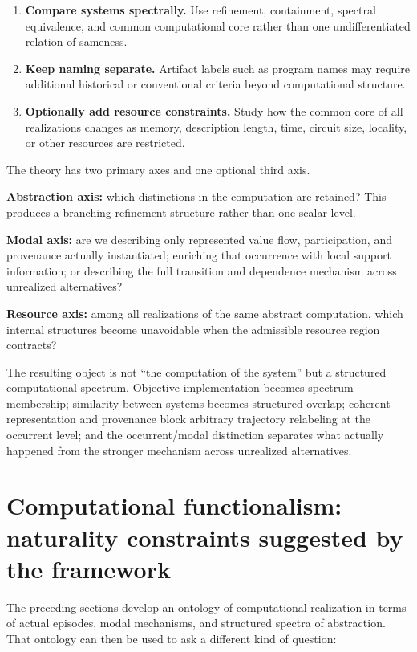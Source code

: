 \documentclass[11pt,a4paper]{article}
\begin{document}
\begin{enumerate}
  \item \textbf{Compare systems spectrally.} Use refinement, containment, spectral equivalence, and common computational core rather than one undifferentiated relation of sameness.
  \item \textbf{Keep naming separate.} Artifact labels such as program names may require additional historical or conventional criteria beyond computational structure.
  \item \textbf{Optionally add resource constraints.} Study how the common core of all realizations changes as memory, description length, time, circuit size, locality, or other resources are restricted.
\end{enumerate}

\begin{thesisbox}[title={The final picture}]
The theory has two primary axes and one optional third axis.

\textbf{Abstraction axis:} which distinctions in the computation are retained? This produces a branching refinement structure rather than one scalar level.

\textbf{Modal axis:} are we describing only represented value flow, participation, and provenance actually instantiated; enriching that occurrence with local support information; or describing the full transition and dependence mechanism across unrealized alternatives?

\textbf{Resource axis:} among all realizations of the same abstract computation, which internal structures become unavoidable when the admissible resource region contracts?

The resulting object is not ``the computation of the system'' but a structured computational spectrum. Objective implementation becomes spectrum membership; similarity between systems becomes structured overlap; coherent representation and provenance block arbitrary trajectory relabeling at the occurrent level; and the occurrent/modal distinction separates what actually happened from the stronger mechanism across unrealized alternatives.
\end{thesisbox}


\section{Computational functionalism: naturality constraints suggested by the framework}

The preceding sections develop an ontology of computational realization in terms of actual episodes, modal mechanisms, and structured spectra of abstraction. That ontology can then be used to ask a different kind of question:
\end{document}
